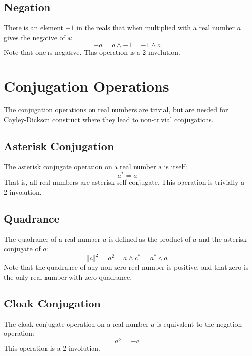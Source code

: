 \subsection{Negation}
There is an element $-1$ in the reals that when multiplied with a real number $a$ gives the negative of $a$:
\begin{equation}
    {-a} = a \wedge {-1} = {-1} \wedge a
\end{equation}
Note that one is negative. This operation is a 2-involution.
\section{Conjugation Operations}
The conjugation operations on real numbers are trivial, but are needed for Cayley-Dickson construct where they lead to non-trivial conjugations.
\subsection{Asterisk Conjugation}
The asterisk conjugate operation on a real number $a$ is itself:
\begin{equation}
    a^{\ast} = a
\end{equation}
That is, all real numbers are asterisk-self-conjugate. This operation is trivially a 2-involution.
\subsection{Quadrance}
The quadrance of a real number $a$ is defined as the product of $a$ and the asterisk conjugate of $a$:
\begin{equation}
    \Vert a \Vert^{2} = a^{2} = a \wedge a^{\ast} = a^{\ast} \wedge a
\end{equation}
Note that the quadrance of any non-zero real number is positive, and that zero is the only real number with zero quadrance.
\subsection{Cloak Conjugation}
The cloak conjugate operation on a real number $a$ is equivalent to the negation operation:
\begin{equation}
    a^{\diamond} = {-a}
\end{equation}
This operation is a 2-involution.
